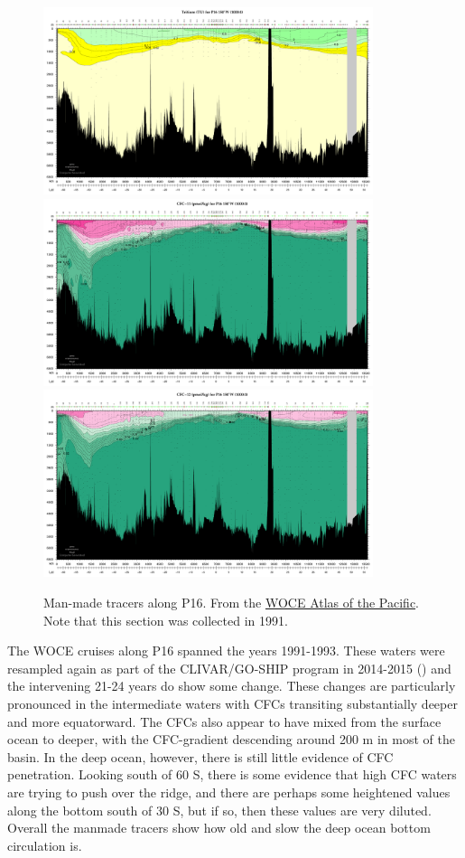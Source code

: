 \begin{figure}[hbt]
  \begin{center}
    \includegraphics[width=3.8in]{figs/WaterMasses/P16TritiumCrop}
    \includegraphics[width=3.8in]{figs/WaterMasses/P16CFC11Crop}
    \includegraphics[width=3.8in]{figs/WaterMasses/P16CFC12Crop}
    \caption{Man-made tracers along P16.  From the \href{http://whp-atlas.ucsd.edu/pacific_index.html}{WOCE Atlas of the Pacific}. Note that this section was collected in 1991.}
    \label{fig:P16Manmade}  
  \end{center}
\end{figure}

The WOCE cruises along P16 spanned the years 1991-1993.  These waters were resampled again as part of the CLIVAR/GO-SHIP program in 2014-2015 () and the intervening 21-24 years do show some change.  These changes are particularly pronounced in the intermediate waters with CFCs transiting substantially deeper and more equatorward.  The CFCs also appear to have mixed from the surface ocean to deeper, with the CFC-gradient descending around 200 m in most of the basin. In the deep ocean, however, there is still little evidence of CFC penetration.  Looking south of 60 S, there is some evidence that high CFC waters are trying to push over the ridge, and there are perhaps some heightened values along the bottom south of 30 S, but if so, then these values are very diluted.  Overall the manmade tracers show how old and slow the deep ocean bottom circulation is.  

